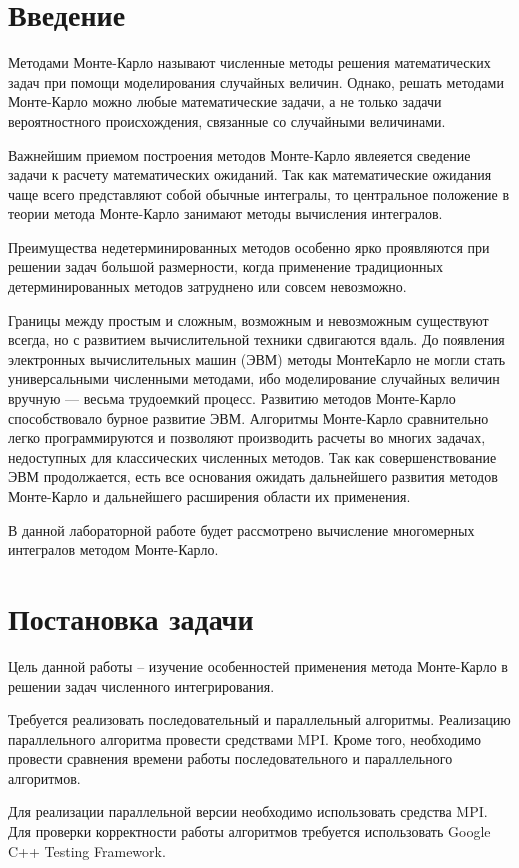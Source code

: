 \documentclass{report}
\begin{document}
\setcounter{page}{2}

\tableofcontents
\newpage

\section*{Введение}
Методами Монте-Карло называют численные методы решения математических задач при помощи моделирования случайных величин. Однако, решать методами Монте-Карло можно любые математические задачи, а не только задачи вероятностного происхождения, связанные со случайными величинами.
\par Важнейшим приемом построения методов Монте-Карло явлеяется сведение задачи к расчету математических ожиданий. Так как математические ожидания чаще всего представляют собой обычные интегралы, то
центральное положение в теории метода Монте-Карло занимают методы вычисления интегралов.
\par Преимущества недетерминированных методов особенно ярко проявляются при решении задач большой размерности, когда применение традиционных детерминированных методов затруднено или совсем невозможно.
\par Границы между простым и сложным, возможным и невозможным существуют всегда, но с развитием вычислительной техники сдвигаются вдаль. До появления электронных вычислительных машин (ЭВМ) методы МонтеКарло не могли стать универсальными численными методами, ибо моделирование случайных величин вручную — весьма трудоемкий процесс. Развитию методов Монте-Карло способствовало бурное развитие ЭВМ. Алгоритмы Монте-Карло сравнительно легко программируются и позволяют производить расчеты во многих задачах, недоступных для классических численных методов. Так как совершенствование ЭВМ продолжается, есть все основания ожидать дальнейшего развития методов Монте-Карло и дальнейшего расширения области их применения.
\par В данной лабораторной работе будет рассмотрено вычисление многомерных интегралов методом Монте-Карло.
\newpage

\section*{Постановка задачи}
Цель данной работы – изучение особенностей применения метода Монте-Карло в решении задач численного интегрирования.
\par Требуется реализовать последовательный и параллельный алгоритмы. Реализацию параллельного алгоритма провести средствами MPI. Кроме того, необходимо провести сравнения времени работы последовательного и параллельного алгоритмов.
\par Для реализации параллельной версии необходимо использовать средства MPI. Для проверки корректности работы алгоритмов требуется использовать Google C++ Testing Framework.
\newpage
\end{document}
